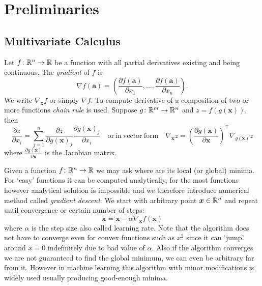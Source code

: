 \chapter{Preliminaries}




\section{Multivariate Calculus}
Let $f\colon\mathbb{R}^n\to\mathbb{R}$ be a function with all partial derivatives existing and being continuous. The \textit{gradient} of $f$ is
\begin{equation*}
\nabla f(\bm{a})=\left(\frac{\partial f(\bm{a})}{\partial x_1},\dots,\frac{\partial f(\bm{a})}{\partial x_n}\right).
\end{equation*}
We write $\nabla_{\bm{x}} f$ or simply $\nabla f$.
To compute derivative of a composition of two or more functions \textit{chain rule} is used. Suppose $g\colon\mathbb{R}^m\to\mathbb{R}^n$ and $z=f(g(\bm{x}))$, then
\begin{equation*}
\frac{\partial z}{\partial x_i}=\sum\limits_{j=1}^n\frac{\partial z}{\partial g(\bm{x})_j}\frac{\partial g(\bm{x})_j}{\partial x_i}\quad\mathrm{or\ in\ vector\ form}\quad\nabla_{\bm{x}}z=\left(\frac{\partial g(\bm{x})}{\partial\bm{x}}\right)^\top\nabla_{g(\bm{x})}z
\end{equation*}
where $\frac{\partial g(\bm{x})}{\partial\bm{x}}$ is the Jacobian matrix.

Given a function $f\colon\mathbb{R}^n\to\mathbb{R}$ we may ask where are its local (or global) minima. For `easy' functions it can be computed analytically, for the most functions however analytical solution is impossible and we therefore introduce numerical method called \textit{gradient descent}. We start with arbitrary point $\bm{x}\in \mathbb{R}{^n}$ and repeat until convergence or certain number of steps:
\begin{equation*}
\bm{x}=\bm{x}-\alpha\nabla_{\bm{x}}f(\bm{x})
\end{equation*}
where $\alpha$ is the step size also called learning rate. Note that the algorithm does not have to converge even for convex functions such as $x^2$ since it can `jump' around $x=0$ indefinitely due to bad value of $\alpha$.
Also if the algorithm converges we are not guaranteed to find the global minimum, we can even be arbitrary far from it. However in machine learning this algorithm with minor modifications is widely used usually producing good-enough minima.

